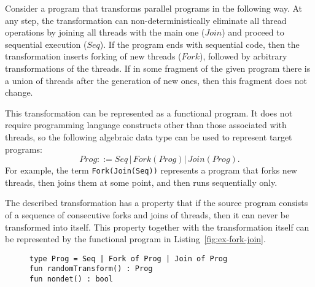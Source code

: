 \begin{example}[$ForkJoin$]\label{ex:fork-join-chcs}
Consider a program that transforms parallel programs in the following way.
At any step, the transformation can non-deterministically eliminate all thread operations by joining all threads with the main one ($Join$) and proceed to sequential execution ($Seq$).
If the program ends with sequential code, then the transformation inserts forking of new threads ($Fork$), followed by arbitrary transformations of the threads.
If in some fragment of the given program there is a union of threads after the generation of new ones, then this fragment does not change.

This transformation can be represented as a functional program. It does not require programming language constructs other than those associated with threads, so the following algebraic data type can be used to represent target programs:
$$ Prog ::= Seq\,|\,Fork(Prog)|\,Join(Prog). $$
For example, the term \texttt{Fork(Join(Seq))} represents a program that forks new threads, then joins them at some point, and then runs sequentially only.

The described transformation has a property that if the source program consists of a sequence of consecutive forks and joins of threads, then it can never be transformed into itself.
This property together with the transformation itself can be represented by the functional program in Listing~\ref{fig:ex-fork-join}.
{\renewcommand{\figurename}{Listing}
\begin{figure}
    \centering
\begin{verbatim}
type Prog = Seq | Fork of Prog | Join of Prog
fun randomTransform() : Prog
fun nondet() : bool


\end{verbatim}
\end{figure}}
\end{example}
